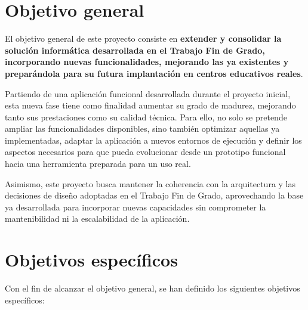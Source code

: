 \section{Objetivo general}

El objetivo general de este proyecto consiste en \textbf{extender y consolidar la solución informática desarrollada en el Trabajo Fin de Grado, incorporando nuevas funcionalidades, mejorando las ya existentes y preparándola para su futura implantación en centros educativos reales}.

Partiendo de una aplicación funcional desarrollada durante el proyecto inicial, esta nueva fase tiene como finalidad aumentar su grado de madurez, mejorando tanto sus prestaciones como su calidad técnica. Para ello, no solo se pretende ampliar las funcionalidades disponibles, sino también optimizar aquellas ya implementadas, adaptar la aplicación a nuevos entornos de ejecución y definir los aspectos necesarios para que pueda evolucionar desde un prototipo funcional hacia una herramienta preparada para un uso real.

Asimismo, este proyecto busca mantener la coherencia con la arquitectura y las decisiones de diseño adoptadas en el Trabajo Fin de Grado, aprovechando la base ya desarrollada para incorporar nuevas capacidades sin comprometer la mantenibilidad ni la escalabilidad de la aplicación.

\section{Objetivos específicos}

Con el fin de alcanzar el objetivo general, se han definido los siguientes objetivos específicos:

